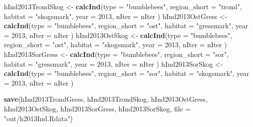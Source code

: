 \documentclass[]{article}
\newenvironment{Shaded}{\begin{snugshade}}{\end{snugshade}}
\newcommand{\KeywordTok}[1]{\textcolor[rgb]{0.13,0.29,0.53}{\textbf{#1}}}
\newcommand{\DataTypeTok}[1]{\textcolor[rgb]{0.13,0.29,0.53}{#1}}
\newcommand{\DecValTok}[1]{\textcolor[rgb]{0.00,0.00,0.81}{#1}}
\newcommand{\StringTok}[1]{\textcolor[rgb]{0.31,0.60,0.02}{#1}}
\newcommand{\NormalTok}[1]{#1}
\begin{document}
\begin{Shaded}
\begin{Highlighting}[]
\NormalTok{hInd2013TrondSkog <-}\StringTok{ }\KeywordTok{calcInd}\NormalTok{(}\DataTypeTok{type =} \StringTok{"bumblebees"}\NormalTok{,}
                              \DataTypeTok{region_short =} \StringTok{"trond"}\NormalTok{,}
                              \DataTypeTok{habitat =} \StringTok{"skogsmark"}\NormalTok{,}
                              \DataTypeTok{year =} \DecValTok{2013}\NormalTok{,}
                              \DataTypeTok{nIter =}\NormalTok{ nIter}
\NormalTok{                              )}
\NormalTok{hInd2013OstGress <-}\StringTok{ }\KeywordTok{calcInd}\NormalTok{(}\DataTypeTok{type =} \StringTok{"bumblebees"}\NormalTok{,}
                              \DataTypeTok{region_short =} \StringTok{"ost"}\NormalTok{,}
                              \DataTypeTok{habitat =} \StringTok{"gressmark"}\NormalTok{,}
                              \DataTypeTok{year =} \DecValTok{2013}\NormalTok{,}
                              \DataTypeTok{nIter =}\NormalTok{ nIter}
\NormalTok{                              )}
\NormalTok{hInd2013OstSkog <-}\StringTok{ }\KeywordTok{calcInd}\NormalTok{(}\DataTypeTok{type =} \StringTok{"bumblebees"}\NormalTok{,}
                              \DataTypeTok{region_short =} \StringTok{"ost"}\NormalTok{,}
                              \DataTypeTok{habitat =} \StringTok{"skogsmark"}\NormalTok{,}
                              \DataTypeTok{year =} \DecValTok{2013}\NormalTok{,}
                              \DataTypeTok{nIter =}\NormalTok{ nIter}
\NormalTok{                              )}
\NormalTok{hInd2013SorGress <-}\StringTok{ }\KeywordTok{calcInd}\NormalTok{(}\DataTypeTok{type =} \StringTok{"bumblebees"}\NormalTok{,}
                              \DataTypeTok{region_short =} \StringTok{"sor"}\NormalTok{,}
                              \DataTypeTok{habitat =} \StringTok{"gressmark"}\NormalTok{,}
                              \DataTypeTok{year =} \DecValTok{2013}\NormalTok{,}
                              \DataTypeTok{nIter =}\NormalTok{ nIter}
\NormalTok{                              )}
\NormalTok{hInd2013SorSkog <-}\StringTok{ }\KeywordTok{calcInd}\NormalTok{(}\DataTypeTok{type =} \StringTok{"bumblebees"}\NormalTok{,}
                              \DataTypeTok{region_short =} \StringTok{"sor"}\NormalTok{,}
                              \DataTypeTok{habitat =} \StringTok{"skogsmark"}\NormalTok{,}
                              \DataTypeTok{year =} \DecValTok{2013}\NormalTok{,}
                              \DataTypeTok{nIter =}\NormalTok{ nIter}
\NormalTok{                              )}

\KeywordTok{save}\NormalTok{(hInd2013TrondGress, hInd2013TrondSkog, hInd2013OstGress, hInd2013OstSkog, hInd2013SorGress, hInd2013SorSkog, }\DataTypeTok{file =} \StringTok{"out/h2013Ind.Rdata"}\NormalTok{)}
\end{Highlighting}
\end{Shaded}
\end{document}
